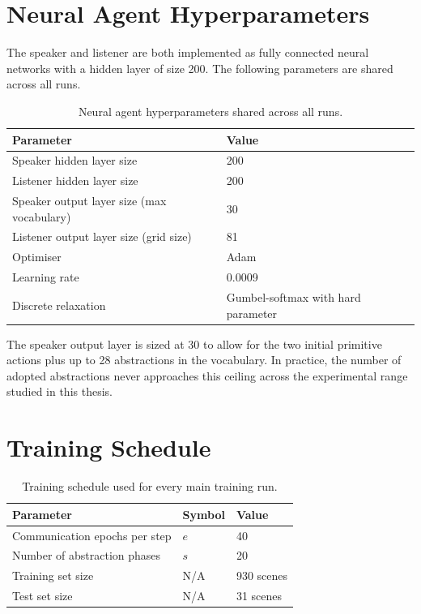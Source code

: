 \section{Neural Agent Hyperparameters}
\label{sec:appendix-neural-hyperparameters}

The speaker and listener are both implemented as fully connected neural networks with a hidden layer of size 200. The following parameters are shared across all runs.

\begin{table}[htbp]
\centering
\begin{tabularx}{0.92\textwidth}{lX}
\toprule
Parameter & Value \\
\midrule
Speaker hidden layer size & 200 \\
Listener hidden layer size & 200 \\
Speaker output layer size (max vocabulary) & 30 \\
Listener output layer size (grid size) & 81 \\
Optimiser & Adam~\cite{kingma_adam_2014} \\
Learning rate & 0.0009 \\
Discrete relaxation & Gumbel-softmax with hard parameter~\cite{jang_categorical_2017} \\
\bottomrule
\end{tabularx}
\caption{Neural agent hyperparameters shared across all runs.}
\label{tab:neural-hyperparameters}
\end{table}

The speaker output layer is sized at 30 to allow for the two initial primitive actions plus up to 28 abstractions in the vocabulary. In practice, the number of adopted abstractions never approaches this ceiling across the experimental range studied in this thesis.

\section{Training Schedule}
\label{sec:appendix-training-schedule}

\begin{table}[htbp]
\centering
\begin{tabular}{lll}
\toprule
Parameter & Symbol & Value \\
\midrule
Communication epochs per step & $e$ & 40 \\
Number of abstraction phases & $s$ & 20 \\
Training set size & N/A & 930 scenes \\
Test set size & N/A & 31 scenes \\
\bottomrule
\end{tabular}
\caption{Training schedule used for every main training run.}
\label{tab:training-schedule}
\end{table}

